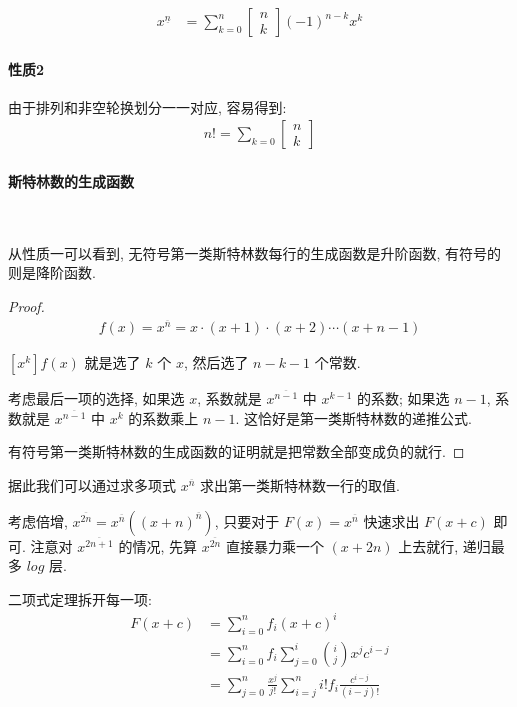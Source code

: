 \documentclass{ctexart}
\begin{document}
\begin{align*}
    x^{\underline{n}} &= \sum_{k=0}^{n} \begin{bmatrix} n\\ k \end{bmatrix} (-1)^{n-k} x^k
\end{align*}

\paragraph{性质2}
由于排列和非空轮换划分一一对应, 容易得到:
\begin{align*}
    n! = \sum_{k=0} \begin{bmatrix} n\\ k \end{bmatrix}
\end{align*}

\paragraph{斯特林数的生成函数}\ 

从性质一可以看到, 无符号第一类斯特林数每行的生成函数是升阶函数, 有符号的则是降阶函数.

\begin{proof}
    \begin{align*}
        f(x)=x^{\overline{n}} = x \cdot (x+1) \cdot (x+2) \cdots (x+n-1)
    \end{align*}

    $[x^k]f(x)$ 就是选了 $k$ 个 $x$, 然后选了 $n-k-1$ 个常数.
    
    考虑最后一项的选择, 如果选 $x$, 系数就是 $x^{\overline{n-1}}$ 中 $x^{k-1}$ 的系数; 
    如果选 $n-1$, 系数就是 $x^{\overline{n-1}}$ 中 $x^{k}$ 的系数乘上 $n-1$. 
    这恰好是第一类斯特林数的递推公式. 

    有符号第一类斯特林数的生成函数的证明就是把常数全部变成负的就行.
\end{proof}

据此我们可以通过求多项式 $x^{\overline{n}}$ 求出第一类斯特林数一行的取值.

考虑倍增, $x^{\overline{2n}}=x^{\overline{n}}((x+n)^{\overline{n}})$, 只要对于 $F(x)=x^{\overline{n}}$ 快速求出 $F(x+c)$ 即可.
注意对 $x^{\overline{2n+1}}$ 的情况, 先算 $x^{\overline{2n}}$ 直接暴力乘一个 $(x+2n)$ 上去就行, 递归最多 $log$ 层.

二项式定理拆开每一项:
\begin{align*}
    F(x+c) &= \sum_{i=0}^{n} f_i (x+c)^i \\
           &= \sum_{i=0}^{n} f_i \sum_{j=0}^{i} \binom{i}{j} x^j c^{i-j}\\
           &= \sum_{j=0}^{n} \frac{x^j}{j!} \sum_{i=j}^{n} i! f_i \frac{c^{i-j}}{(i-j)!}
\end{align*}
\end{document}
